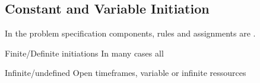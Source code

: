 \subsection{Constant and Variable Initiation}

In the problem specification components, rules and assignments are .

Finite/Definite initiations
In many cases all 

Infinite/undefined 
Open timeframes, variable or infinite ressources